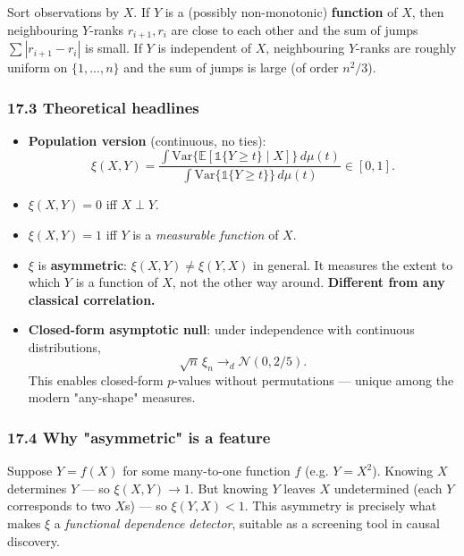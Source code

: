 \documentclass{article}
\providecommand{\tightlist}{\setlength{\itemsep}{0pt}\setlength{\parskip}{0pt}}
\begin{document}
Sort observations by \(X\). If \(Y\) is a (possibly non-monotonic)
\textbf{function} of \(X\), then neighbouring \(Y\)-ranks
\(r_{i+1}, r_i\) are close to each other and the sum of jumps
\(\sum |r_{i+1} - r_i|\) is small. If \(Y\) is independent of \(X\),
neighbouring \(Y\)-ranks are roughly uniform on \(\{1, \dots, n\}\) and
the sum of jumps is large (of order \(n^2/3\)).

\subsubsection{17.3 Theoretical
headlines}\label{173-theoretical-headlines}

\begin{itemize}
\tightlist
\item
  \textbf{Population version} (continuous, no ties): \[
  \xi(X, Y) = \frac{\int \mathrm{Var}\{\mathbb{E}[\mathbb{1}\{Y \geq t\} \mid X]\}\, d\mu(t)}{\int \mathrm{Var}\{\mathbb{1}\{Y \geq t\}\}\, d\mu(t)} \in [0, 1].
  \]
\item
  \(\xi(X, Y) = 0\) iff \(X \perp Y\).
\item
  \(\xi(X, Y) = 1\) iff \(Y\) is a \emph{measurable function} of \(X\).
\item
  \(\xi\) is \textbf{asymmetric}: \(\xi(X, Y) \neq \xi(Y, X)\) in
  general. It measures the extent to which \(Y\) is a function of \(X\),
  not the other way around. \textbf{Different from any classical
  correlation.}
\item
  \textbf{Closed-form asymptotic null}: under independence with
  continuous distributions, \[
  \sqrt{n}\, \xi_n \to_d \mathcal{N}(0, 2/5).
  \] This enables closed-form \(p\)-values without permutations ---
  unique among the modern "any-shape" measures.
\end{itemize}

\subsubsection{17.4 Why "asymmetric" is a
feature}\label{174-why-asymmetric-is-a-feature}

Suppose \(Y = f(X)\) for some many-to-one function \(f\) (e.g.
\(Y = X^2\)). Knowing \(X\) determines \(Y\) --- so \(\xi(X, Y) \to 1\).
But knowing \(Y\) leaves \(X\) undetermined (each \(Y\) corresponds to
two \(X\)\textquotesingle s) --- so \(\xi(Y, X) < 1\). This asymmetry is
precisely what makes \(\xi\) a \emph{functional dependence detector},
suitable as a screening tool in causal discovery.
\end{document}
